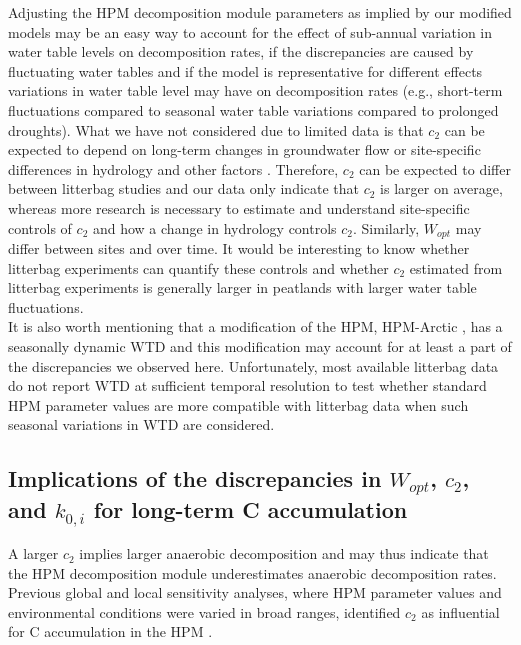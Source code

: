 \documentclass[esd, manuscript]{copernicus}
\begin{document}
Adjusting the HPM decomposition module parameters as implied by our modified models may be an easy way to account for the effect of sub-annual variation in water table levels on decomposition rates, if the discrepancies are caused by fluctuating water tables and if the model is representative for different effects variations in water table level may have on decomposition rates (e.g., short-term fluctuations compared to seasonal water table variations compared to prolonged droughts). What we have not considered due to limited data is that \(c_2\) can be expected to depend on long-term changes in groundwater flow \citep[e.g.,][]{Siegel.1995} or site-specific differences in hydrology and other factors \citep[e.g.,][]{Frolking.2010, Treat.2021, Treat.2022}. Therefore, \(c_2\) can be expected to differ between litterbag studies and our data only indicate that \(c_2\) is larger on average, whereas more research is necessary to estimate and understand site-specific controls of \(c_2\) and how a change in hydrology controls \(c_2\). Similarly, \(W_{opt}\) may differ between sites and over time. It would be interesting to know whether litterbag experiments can quantify these controls and whether \(c_2\) estimated from litterbag experiments is generally larger in peatlands with larger water table fluctuations.\\
It is also worth mentioning that a modification of the HPM, HPM-Arctic \citep{Treat.2021}, has a seasonally dynamic WTD and this modification may account for at least a part of the discrepancies we observed here. Unfortunately, most available litterbag data do not report WTD at sufficient temporal resolution to test whether standard HPM parameter values are more compatible with litterbag data when such seasonal variations in WTD are considered.

\hypertarget{out-discussion-5}{%
\subsection{\texorpdfstring{Implications of the discrepancies in \(W_{opt}\), \(c_2\), and \(k_{0,i}\) for long-term C accumulation}{Implications of the discrepancies in W\_\{opt\}, c\_2, and k\_\{0,i\} for long-term C accumulation}}\label{out-discussion-5}}

A larger \(c_2\) implies larger anaerobic decomposition and may thus indicate that the HPM decomposition module underestimates anaerobic decomposition rates. Previous global and local sensitivity analyses, where HPM parameter values and environmental conditions were varied in broad ranges, identified \(c_2\) as influential for C accumulation in the HPM \citep{Quillet.2013, Quillet.2013a}.
\end{document}
